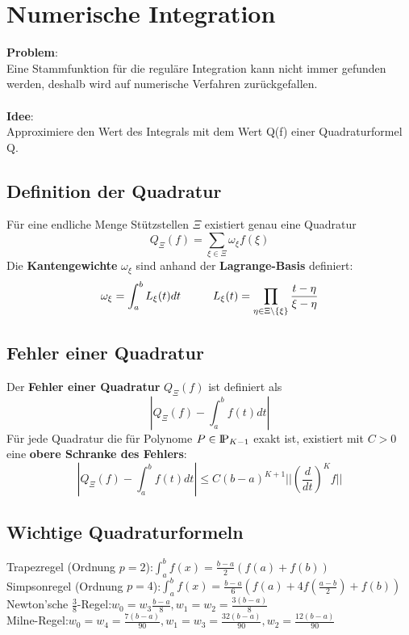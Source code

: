 \documentclass[10pt,a4paper]{article}
\def\polynomials{{\rm I\!P}}
\begin{document}
	\section{Numerische Integration}
	\textbf{Problem}:\\Eine Stammfunktion für die reguläre Integration kann nicht immer gefunden werden, deshalb wird auf numerische Verfahren zurückgefallen.\\\\
	\textbf{Idee}:\\Approximiere den Wert des Integrals mit dem Wert Q(f) einer Quadraturformel Q.

	\subsection{Definition der Quadratur}
	Für eine endliche Menge Stützstellen $\Xi$ existiert genau eine Quadratur $$Q_\Xi(f) = \sum_{\xi \in \Xi} \omega_\xi f(\xi)$$
	Die \textbf{Kantengewichte} $\omega_\xi$ sind anhand der \textbf{Lagrange-Basis} definiert:
	$$\omega_\xi = \int_a^bL_\xi(t)dt\hspace*{1cm}L_\xi(t) = \prod_{\eta \in \Xi \setminus \{\xi\}} \frac{t - \eta}{\xi - \eta}$$

	\subsection{Fehler einer Quadratur}
	Der \textbf{Fehler einer Quadratur} $Q_\Xi(f)$ ist definiert als $$|Q_\Xi(f) - \int^b_af(t)dt|$$
	Für jede Quadratur die für Polynome $P \in \polynomials_{K-1}$ exakt ist, existiert mit $C > 0$ eine \textbf{obere Schranke des Fehlers}:
	$$|Q_\Xi(f) - \int^b_af(t)dt| \leq C(b - a)^{K+1}||(\frac{d}{dt})^Kf||$$

	\subsection{Wichtige Quadraturformeln}
        Trapezregel (Ordnung $p = 2$):\hfill$\int_{a}^{b} f(x) = \frac{b - a}{2} (f(a) + f(b))$ \\
        Simpsonregel (Ordnung $p = 4$):\hfill$\int_{a}^{b} f(x) = \frac{b - a}{6} (f(a) + 4f(\frac{a-b}{2}) + f(b))$ \\
        Newton'sche $\frac{3}{8}$-Regel:\hfill$w_0 = w_3 \frac{b - a}{8}, w_1 = w_2 = \frac{3(b - a)}{8}$ \\
        Milne-Regel:\hfill$w_0 = w_4 = \frac{7(b - a)}{90}, w_1 = w_3 = \frac{32(b - a)}{90}, w_2 = \frac{12(b - a)}{90}$ \\
\end{document}
